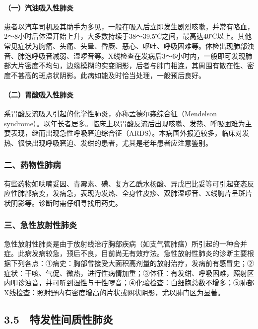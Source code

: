 \paragraph{（一）汽油吸入性肺炎}

患者以汽车司机及其助手为多见，一般在吸入后立即发生剧烈咳嗽，并常有咯血，2～8小时后体温开始上升，大多数持续于38～39.5℃之间，最高达40℃以上。其他常见症状为胸痛、头痛、头晕、昏厥、恶心、呕吐、呼吸困难等。体检出现肺部浊音、肺泡呼吸音减弱、湿啰音等。X线检查在发病后3～6小时内，一般即可发现肺部大片密度不均匀，边缘模糊的实变阴影，后者与肺门相连，其周围有散在性、密度不甚高的斑点状阴影。此病如能及时恰当处理，一般预后良好。

\paragraph{（二）胃酸吸入性肺炎}

系胃酸反流吸入引起的化学性肺炎，亦称孟德尔森综合征（Mendelson
syndrome）。以年长者居多。临床上以胃酸反流后出现咳嗽、发热、呼吸困难为主要表现，继而出现急性呼吸窘迫综合征（ARDS）。本病国外报道较多，临床对发热、很快出现呼吸窘迫、发绀的患者，尤其是老年患者应注意鉴别。

\subsubsection{二、药物性肺病}

有些药物如呋喃妥因、青霉素、碘、复方乙酰水杨酸、异戊巴比妥等可引起变态反应性肺部病变，发病急，表现为发热、全身性皮疹、双肺湿啰音、X线胸片呈斑片状阴影等。诊断时需仔细寻找用药史。

\subsubsection{三、急性放射性肺炎}

急性放射性肺炎是由于放射线治疗胸部疾病（如支气管肺癌）所引起的一种合并症。此病发病较急，预后不良，目前尚无有效疗法。急性放射性肺炎的诊断主要根据下列各点：①病史：胸部曾接受大面积高剂量的放射治疗，发病前有感冒史；②症状：干咳、气促、微热，进行性病情加重；③体征：有发绀、呼吸困难，照射区内叩诊浊音，并可听到湿性与干性啰音；④化验检查：白细胞总数不增多；⑤肺部X线检查：照射野内有密度增高的片状或网状阴影，尤以肺门区为显著。

\protect\hypertarget{text00029.html}{}{}

\subsection{3.5　特发性间质性肺炎}

